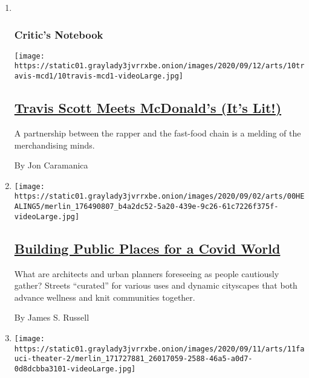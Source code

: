 \begin{enumerate}
\def\labelenumi{\arabic{enumi}.}
\item ~
  \hypertarget{critics-notebook}{%
  \subsubsection{Critic's Notebook}\label{critics-notebook}}

  \texttt{[image: https://static01.graylady3jvrrxbe.onion/images/2020/09/12/arts/10travis-mcd1/10travis-mcd1-videoLarge.jpg]}

  \hypertarget{travis-scott-meets-mcdonalds-its-lit}{%
  \subsection{\texorpdfstring{\href{/2020/09/11/arts/music/travis-scott-mcdonalds.html}{Travis
  Scott Meets McDonald's (It's
  Lit!)}}{Travis Scott Meets McDonald's (It's Lit!)}}\label{travis-scott-meets-mcdonalds-its-lit}}

  A partnership between the rapper and the fast-food chain is a melding
  of the merchandising minds.

  By Jon Caramanica
\item
  \texttt{[image: https://static01.graylady3jvrrxbe.onion/images/2020/09/02/arts/00HEALING5/merlin\_176490807\_b4a2dc52-5a20-439e-9c26-61c7226f375f-videoLarge.jpg]}

  \hypertarget{building-public-places-for-a-covid-world}{%
  \subsection{\texorpdfstring{\href{/2020/09/11/arts/design/architecture-urban-planning-coronavirus.html}{Building
  Public Places for a Covid
  World}}{Building Public Places for a Covid World}}\label{building-public-places-for-a-covid-world}}

  What are architects and urban planners foreseeing as people cautiously
  gather? Streets ``curated'' for various uses and dynamic cityscapes
  that both advance wellness and knit communities together.

  By James S. Russell
\item
  \texttt{[image: https://static01.graylady3jvrrxbe.onion/images/2020/09/11/arts/11fauci-theater-2/merlin\_171727881\_26017059-2588-46a5-a0d7-0d8dcbba3101-videoLarge.jpg]}

  \hypertarget{fauci-says-it-could-be-a-year-before-theater-without-masks-feels-normal}{%
}
\end{enumerate}
